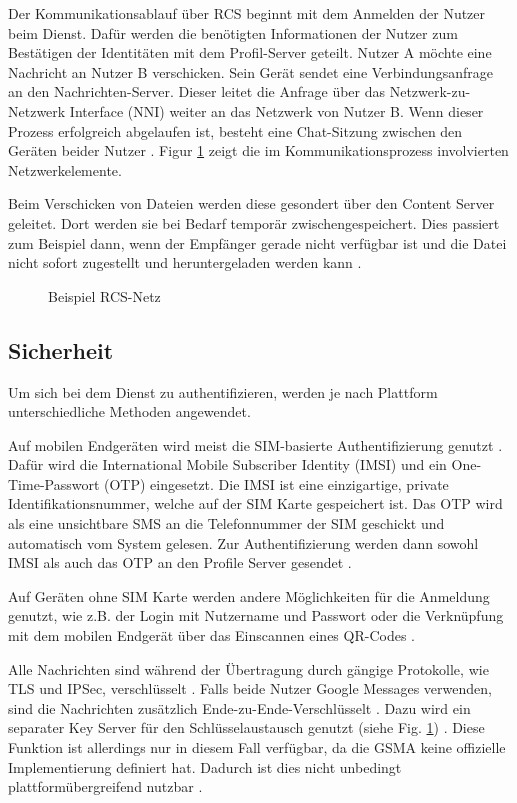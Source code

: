 \documentclass[conference]{IEEEtran}
\begin{document}
Der Kommunikationsablauf über RCS beginnt mit dem Anmelden der Nutzer beim Dienst.
Dafür werden die benötigten Informationen der Nutzer zum Bestätigen der Identitäten mit dem Profil-Server geteilt.
Nutzer A möchte eine Nachricht an Nutzer B verschicken.
Sein Gerät sendet eine Verbindungsanfrage an den Nachrichten-Server.
Dieser leitet die Anfrage über das Netzwerk-zu-Netzwerk Interface (NNI) weiter an das Netzwerk von Nutzer B.
Wenn dieser Prozess erfolgreich abgelaufen ist, besteht eine Chat-Sitzung zwischen den Geräten beider Nutzer \cite{5gmsg}.
Figur \ref{rcsnetz} zeigt die im Kommunikationsprozess involvierten Netzwerkelemente.

Beim Verschicken von Dateien werden diese gesondert über den Content Server geleitet.
Dort werden sie bei Bedarf temporär zwischengespeichert.
Dies passiert zum Beispiel dann, wenn der Empfänger gerade nicht verfügbar ist und die Datei nicht sofort zugestellt und heruntergeladen werden kann \cite{5gmsg}.

\begin{figure}
    \centerline{}
    \caption{Beispiel RCS-Netz \cite{5gmsg}}
    \label{rcsnetz}
\end{figure}

\subsection{Sicherheit}

Um sich bei dem Dienst zu authentifizieren, werden je nach Plattform unterschiedliche Methoden angewendet.

Auf mobilen Endgeräten wird meist die SIM-basierte Authentifizierung genutzt \cite{uniprof}.
Dafür wird die International Mobile Subscriber Identity (IMSI) und ein One-Time-Passwort (OTP) eingesetzt.
Die IMSI ist eine einzigartige, private Identifikationsnummer, welche auf der SIM Karte gespeichert ist.
Das OTP wird als eine unsichtbare SMS an die Telefonnummer der SIM geschickt und automatisch vom System gelesen.
Zur Authentifizierung werden dann sowohl IMSI als auch das OTP an den Profile Server gesendet \cite{5gmsg}.

Auf Geräten ohne SIM Karte werden andere Möglichkeiten für die Anmeldung genutzt, wie z.B. der Login mit Nutzername und Passwort oder die Verknüpfung mit dem mobilen Endgerät über das Einscannen eines QR-Codes \cite{uniprof}.

Alle Nachrichten sind während der Übertragung durch gängige Protokolle, wie TLS und IPSec, verschlüsselt \cite{uniprof}.
Falls beide Nutzer Google Messages verwenden, sind die Nachrichten zusätzlich Ende-zu-Ende-Verschlüsselt \cite{googlemessagessecure}.
Dazu wird ein separater Key Server für den Schlüsselaustausch genutzt (siehe Fig. \ref{rcsnetz}) \cite{5gmsg}.
Diese Funktion ist allerdings nur in diesem Fall verfügbar, da die GSMA keine offizielle Implementierung definiert hat.
Dadurch ist dies nicht unbedingt plattformübergreifend nutzbar \cite{googlemessagessecure}.
\end{document}
